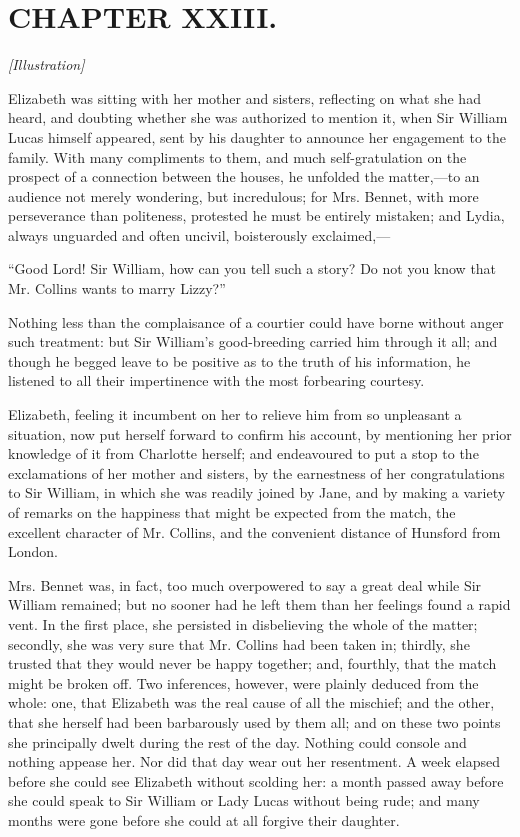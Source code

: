 \documentclass[12pt]{book}
\begin{document}
\chapter{CHAPTER XXIII.}

\emph{[Illustration]}

Elizabeth was sitting with her mother and sisters, reflecting on what she had heard, and doubting whether she was authorized to mention it, when Sir William Lucas himself appeared, sent by his daughter to announce her engagement to the family. With many compliments to them, and much self-gratulation on the prospect of a connection between the houses, he unfolded the matter,---to an audience not merely wondering, but incredulous; for Mrs. Bennet, with more perseverance than politeness, protested he must be entirely mistaken; and Lydia, always unguarded and often uncivil, boisterously exclaimed,---

``Good Lord! Sir William, how can you tell such a story? Do not you know that Mr. Collins wants to marry Lizzy?''

Nothing less than the complaisance of a courtier could have borne without anger such treatment: but Sir William's good-breeding carried him through it all; and though he begged leave to be positive as to the truth of his information, he listened to all their impertinence with the most forbearing courtesy.

Elizabeth, feeling it incumbent on her to relieve him from so unpleasant a situation, now put herself forward to confirm his account, by mentioning her prior knowledge of it from Charlotte herself; and endeavoured to put a stop to the exclamations of her mother and sisters, by the earnestness of her congratulations to Sir William, in which she was readily joined by Jane, and by making a variety of remarks on the happiness that might be expected from the match, the excellent character of Mr. Collins, and the convenient distance of Hunsford from London.

Mrs. Bennet was, in fact, too much overpowered to say a great deal while Sir William remained; but no sooner had he left them than her feelings found a rapid vent. In the first place, she persisted in disbelieving the whole of the matter; secondly, she was very sure that Mr. Collins had been taken in; thirdly, she trusted that they would never be happy together; and, fourthly, that the match might be broken off. Two inferences, however, were plainly deduced from the whole: one, that Elizabeth was the real cause of all the mischief; and the other, that she herself had been barbarously used by them all; and on these two points she principally dwelt during the rest of the day. Nothing could console and nothing appease her. Nor did that day wear out her resentment. A week elapsed before she could see Elizabeth without scolding her: a month passed away before she could speak to Sir William or Lady Lucas without being rude; and many months were gone before she could at all forgive their daughter.
\end{document}
